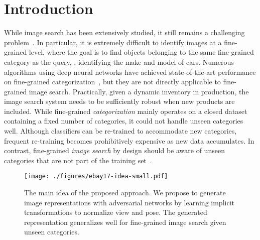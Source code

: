 \documentclass[runningheads]{llncs}
\begin{document}
\section{Introduction}\label{sec:intro}

While image search has been extensively studied, it still remains a challenging problem~\cite{DBLP:conf/iccv/SivicZ03,DBLP:conf/mm/WanWHWZZL14,DBLP:conf/kdd/JingLKZXDT15,DBLP:conf/kdd/YangKBSWKP17}. In particular, it is extremely difficult to identify images at a fine-grained level, where the goal is to find objects belonging to the same fine-grained category as the query, \eg, identifying the make and model of cars. 
Numerous algorithms using deep neural networks have achieved state-of-the-art performance on fine-grained categorization~\cite{DBLP:conf/cvpr/DengK013,DBLP:conf/icpr/KrauseGDLF14,DBLP:conf/cvpr/KrauseJYL15,DBLP:conf/cvpr/QianJZL15,DBLP:conf/cvpr/XieYWL15,lin2015bilinear,DBLP:conf/cvpr/CuiZLB16,zhou2016fine,cui2017kernel}, but they are not directly applicable to fine-grained image search. 
Practically, given a dynamic inventory in production, the image search system needs to be sufficiently robust when new products are included.
While fine-grained \emph{categorization} mainly operates on a closed dataset containing a fixed number of categories, it could not handle unseen categories well.
Although classifiers can be re-trained to accommodate new categories, frequent re-training becomes prohibitively expensive as new data accumulates.
In contrast, fine-grained \emph{image search} by design should be aware of unseen categories that are not part of the training set~\cite{DBLP:journals/corr/YaoZZLT17a}. 

\setlength{\textfloatsep}{12pt}\begin{figure}[t]
\begin{center}
\texttt{[image: ./figures/ebay17-idea-small.pdf]}
\end{center} 
\vspace{-3mm}
\caption{The main idea of the proposed approach. 
We propose to generate image representations with adversarial networks by learning implicit transformations to normalize view and pose. The generated representation generalizes well for fine-grained image search given unseen categories.}
\label{fig:idea}
\end{figure}
\end{document}
